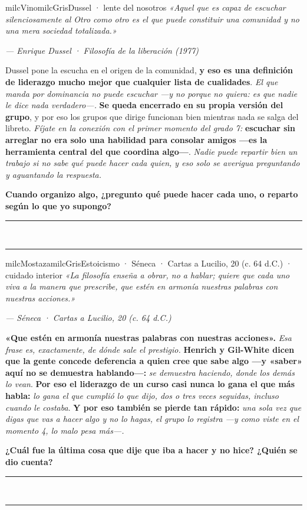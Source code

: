 \documentclass[11pt,letterpaper]{article}
\newcommand{\linead}[1]{\noindent\color{milcLinea}\rule{#1}{0.5pt}\color{milcNegro}}
\begin{document}
\begin{softbox}{milcVino}{milcGris}{Dussel · lente del nosotros}
\textit{«Aquel que es capaz de escuchar silenciosamente al Otro como otro es el que puede constituir una comunidad y no una mera sociedad totalizada.»}

{\footnotesize\itshape\color{milcNegro!70}--- Enrique Dussel · Filosofía de la liberación (1977)}

Dussel pone la escucha en el origen de la comunidad, \textbf{y eso es una definición de liderazgo mucho mejor que cualquier lista de cualidades}. \emph{El que manda por dominancia no puede escuchar ---y no porque no quiera: es que nadie le dice nada verdadero---.} \textbf{Se queda encerrado en su propia versión del grupo}, y por eso los grupos que dirige funcionan bien mientras nada se salga del libreto. \emph{Fíjate en la conexión con el primer momento del grado 7:} \textbf{escuchar sin arreglar no era solo una habilidad para consolar amigos ---es la herramienta central del que coordina algo---}. \emph{Nadie puede repartir bien un trabajo si no sabe qué puede hacer cada quien, y eso solo se averigua preguntando y aguantando la respuesta.}

\textbf{Cuando organizo algo, ¿pregunto qué puede hacer cada uno, o reparto según lo que yo supongo?}
\end{softbox}
\linead{\linewidth}\\[1mm]
\linead{\linewidth}

\begin{softbox}{milcMostaza}{milcGris}{Estoicismo · Séneca · Cartas a Lucilio, 20 (c. 64 d.C.) · cuidado interior}
\textit{«La filosofía enseña a obrar, no a hablar; quiere que cada uno viva a la manera que prescribe, que estén en armonía nuestras palabras con nuestras acciones.»}

{\footnotesize\itshape\color{milcNegro!70}--- Séneca · Cartas a Lucilio, 20 (c. 64 d.C.)}

\textbf{«Que estén en armonía nuestras palabras con nuestras acciones».} \emph{Esa frase es, exactamente, de dónde sale el prestigio.} \textbf{Henrich y Gil-White dicen que la gente concede deferencia a quien cree que sabe algo ---y «saber» aquí no se demuestra hablando---:} \emph{se demuestra haciendo, donde los demás lo vean}. \textbf{Por eso el liderazgo de un curso casi nunca lo gana el que más habla:} \emph{lo gana el que cumplió lo que dijo, dos o tres veces seguidas, incluso cuando le costaba}. \textbf{Y por eso también se pierde tan rápido:} \emph{una sola vez que digas que vas a hacer algo y no lo hagas, el grupo lo registra ---y como viste en el momento 4, lo malo pesa más---.}

\textbf{¿Cuál fue la última cosa que dije que iba a hacer y no hice? ¿Quién se dio cuenta?}
\end{softbox}
\linead{\linewidth}\\[1mm]
\linead{\linewidth}
\end{document}
